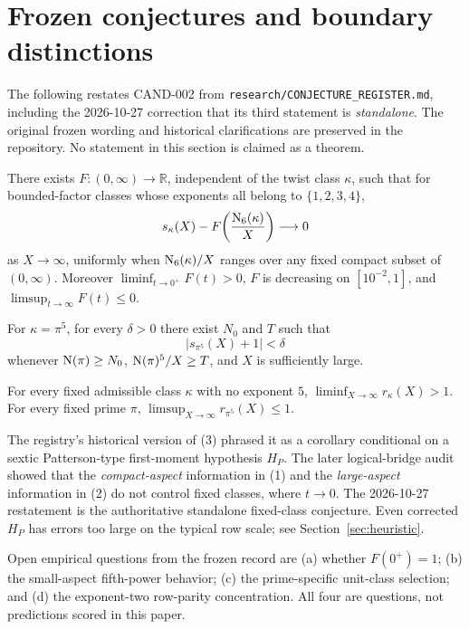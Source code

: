 \section{Frozen conjectures and boundary distinctions}\label{sec:conj}
The following restates CAND-002 from
\texttt{research/CONJECTURE\_REGISTER.md}, including the
2026-10-27 correction that its third statement is \emph{standalone}.
The original frozen wording and historical clarifications
are preserved in the repository. No statement in this
section is claimed as a theorem.

\begin{conjecture}\label{conj:one}
There exists \(F:(0,\infty)\to\mathbb R\),
independent of the twist class \(\kappa\), such that for
bounded-factor classes whose exponents all belong to
\(\{1,2,3,4\}\),
\[
 s_\kappa(X)-F\!\left(\frac{\operatorname{N}_6(\kappa)}X\right)\longrightarrow0
\]
as \(X\to\infty\), uniformly when \(\operatorname{N}_6(\kappa)/X\)
ranges over any fixed compact subset of \((0,\infty)\).
Moreover \(\liminf_{t\to0^+}F(t)>0\), \(F\) is decreasing
on \([10^{-2},1]\), and
\(\limsup_{t\to\infty}F(t)\le0\).
\end{conjecture}

\begin{conjecture}\label{conj:two}
For \(\kappa=\pi^5\), for every \(\delta>0\)
there exist \(N_0\) and \(T\) such that
\[
 |s_{\pi^5}(X)+1|<\delta
\]
whenever \(\operatorname{N}(\pi)\ge N_0\),
\(\operatorname{N}(\pi)^5/X\ge T\), and \(X\) is sufficiently large.
\end{conjecture}

\begin{conjecture}\label{conj:three}
For every fixed admissible class \(\kappa\) with
no exponent \(5\),
\(\liminf_{X\to\infty}r_\kappa(X)>1\).
For every fixed prime \(\pi\),
\(\limsup_{X\to\infty}r_{\pi^5}(X)\le1\).
\end{conjecture}

The registry's historical version of (3) phrased it as
a corollary conditional on a sextic Patterson-type
first-moment hypothesis \(H_P\).
The later logical-bridge audit showed that the
\emph{compact-aspect} information in (1) and the
\emph{large-aspect} information in (2) do not control
fixed classes, where \(t\to0\). The 2026-10-27
restatement is the authoritative standalone
fixed-class conjecture. Even corrected \(H_P\) has
errors too large on the typical row scale; see
Section~\ref{sec:heuristic}.

Open empirical questions from the frozen record are
(a) whether \(F(0^+)=1\);
(b) the small-aspect fifth-power behavior;
(c) the prime-specific unit-class selection; and
(d) the exponent-two row-parity concentration.
All four are questions, not predictions scored in this paper.
